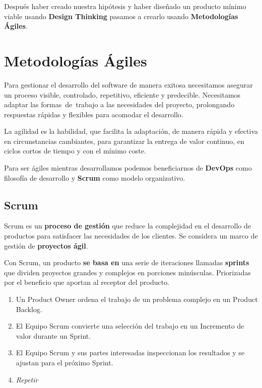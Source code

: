 \documentclass[12pt,twoside,titlepage]{report}
\begin{document}
Después haber creado nuestra hipótesis y haber diseñado un producto mínimo viable usando \textbf{Design Thinking} pasamos a crearlo usando \textbf{Metodologías Ágiles}.

\chapter{Metodologías Ágiles}

Para gestionar el desarrollo del software de manera exitosa necesitamos asegurar un proceso visible, controlado, repetitivo, eficiente y predecible. Necesitamos adaptar las formas de trabajo a las necesidades del proyecto, prolongando respuestas rápidas y flexibles para acomodar el desarrollo.

La agilidad es la habilidad, que facilita la adaptación, de manera rápida y efectiva en circunstancias cambiantes, para garantizar la entrega de valor continuo, en ciclos cortos de tiempo y con el mínimo coste.

Para ser ágiles mientras desarrollamos podemos beneficiarnos de \textbf{DevOps} como filosofía de desarrollo y \textbf{Scrum} como modelo organizativo.

\section{Scrum}

Scrum es un \textbf{proceso de gestión} que reduce la complejidad en el desarrollo de productos para satisfacer las necesidades de los clientes. Se considera un marco de gestión de \textbf{proyectos ágil}.

Con Scrum, un producto \textbf{se basa en} una serie de iteraciones llamadas \textbf{sprints} que dividen proyectos grandes y complejos en porciones minúsculas. Priorizadas por el beneficio que aportan al receptor del producto.

\begin{enumerate}
    \item Un Product Owner ordena el trabajo de un problema complejo en un Product Backlog.
    \item El Equipo Scrum convierte una selección del trabajo en un Incremento de valor durante un Sprint.
    \item El Equipo Scrum y sus partes interesadas inspeccionan los resultados y se ajustan para el próximo Sprint.
    \item \textit{Repetir}
\end{enumerate}
\end{document}
